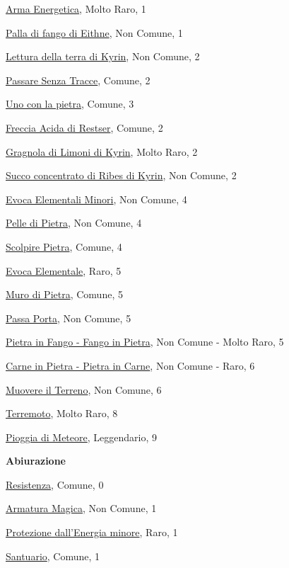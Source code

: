 \begin{multicols}{3}
{{\hyperlink{Arma Energetica}{Arma Energetica}, Molto Raro, 1

\hyperlink{Palla di fango di Eithne}{Palla di fango di Eithne}, Non Comune, 1

\hyperlink{Lettura della terra di Kyrin}{Lettura della terra di Kyrin}, Non Comune, 2

\hyperlink{Passare Senza Tracce}{Passare Senza Tracce}, Comune, 2

\hyperlink{Uno con la pietra}{Uno con la pietra}, Comune, 3

\hyperlink{Freccia Acida di Restser}{Freccia Acida di Restser}, Comune, 2

\hyperlink{Gragnola di Limoni di Kyrin}{Gragnola di Limoni di Kyrin}, Molto Raro, 2

\hyperlink{Succo concentrato di Ribes di Kyrin}{Succo concentrato di Ribes di Kyrin}, Non Comune, 2

\hyperlink{Evoca Elementali Minori}{Evoca Elementali Minori}, Non Comune, 4

\hyperlink{Pelle di Pietra}{Pelle di Pietra}, Non Comune, 4

\hyperlink{Scolpire Pietra}{Scolpire Pietra}, Comune, 4

\hyperlink{Evoca Elementale}{Evoca Elementale}, Raro, 5

\hyperlink{Muro di Pietra}{Muro di Pietra}, Comune, 5

\hyperlink{Passa Porta}{Passa Porta}, Non Comune, 5

\hyperlink{Pietra in Fango - Fango in Pietra}{Pietra in Fango - Fango in Pietra}, Non Comune - Molto Raro, 5

\hyperlink{Carne in Pietra - Pietra in Carne}{Carne in Pietra - Pietra in Carne}, Non Comune - Raro, 6

\hyperlink{Muovere il Terreno}{Muovere il Terreno}, Non Comune, 6

\hyperlink{Terremoto}{Terremoto}, Molto Raro, 8

\hyperlink{Pioggia di Meteore}{Pioggia di Meteore}, Leggendario, 9

\medskip\textbf{Abiurazione}

\hyperlink{Resistenza}{Resistenza}, Comune, 0

\hyperlink{Armatura Magica}{Armatura Magica}, Non Comune, 1

\hyperlink{Protezione dall'Energia minore}{Protezione dall'Energia minore}, Raro, 1

\hyperlink{Santuario}{Santuario}, Comune, 1

}}
\end{multicols}
